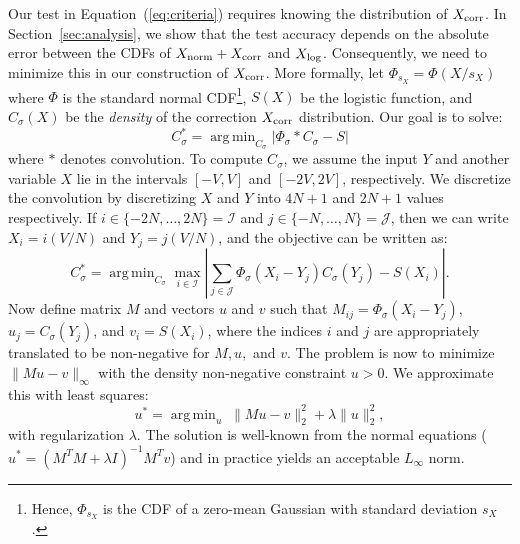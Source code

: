 \documentclass[letterpaper]{article}
\DeclareMathOperator*{\argmin}{arg\,min}
\begin{document}
Our test in Equation~(\ref{eq:criteria}) requires knowing the distribution of
$X_{\rm corr}$. In Section~\ref{sec:analysis}, we show that the test accuracy
depends on the absolute error between the CDFs of $X_{\rm norm} + X_{\rm corr}$
and $X_{\rm log}$. Consequently, we need to minimize this in our construction of
$X_{\rm corr}$. More formally, let $\Phi_{s_X} = \Phi(X/s_X)$ where $\Phi$ is
the standard normal CDF\footnote{Hence, $\Phi_{s_X}$ is the CDF of a zero-mean
Gaussian with standard deviation $s_X$.}, $S(X)$ be the logistic function, and
$C_{\sigma}(X)$ be the \emph{density} of the correction $X_{\rm corr}$
distribution. Our goal is to solve:
\begin{equation}\label{eq:overall_corr_problem}
    C_\sigma^* = \argmin_{C_\sigma} |\Phi_{\sigma} * C_{\sigma} - S|
\end{equation}
where $*$ denotes convolution. To compute $C_\sigma$, we assume the input $Y$
and another variable $X$ lie in the intervals $[-V,V]$ and $[-2V,2V]$,
respectively.  We discretize the convolution by discretizing $X$ and $Y$ into
$4N+1$ and $2N+1$ values respectively. If $i \in \{-2N, \ldots,
2N\}=\mathcal{I}$ and $j \in \{-N, \ldots, N\}=\mathcal{J}$, then we can write
$X_i = i(V/N)$ and $Y_j = j(V/N)$, and the objective can be written as:
\[
C_\sigma^* = \argmin_{C_\sigma} \max_{i \in \mathcal{I}}\left|\sum_{j\in\mathcal{J}} \Phi_{\sigma}(X_i-Y_j) C_{\sigma}(Y_j) - S(X_i)\right|.
\]
Now define matrix $M$ and vectors $u$ and $v$ such that $M_{ij} =
\Phi_{\sigma}(X_i-Y_j)$, $u_j = C_{\sigma}(Y_j)$, and $v_i = S(X_i)$, where the
indices $i$ and $j$ are appropriately translated to be non-negative for $M, u,$
and $v$. The problem is now to minimize $\|Mu-v\|_{\infty}$ with the density
non-negative constraint $u > 0$. We approximate this with least squares:
\begin{equation}\label{eq:optimization_l2}
    u^* = \argmin_u\; \|Mu-v\|_2^2 + \lambda \|u\|_2^2,
\end{equation}
with regularization $\lambda$. The solution is well-known from the normal
equations ($u^* = (M^TM + \lambda I)^{-1}M^Tv$) and in practice yields an
acceptable $L_{\infty}$ norm.
\end{document}
